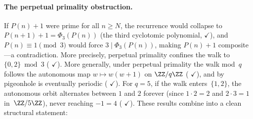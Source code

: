 \paragraph{The perpetual primality obstruction.}
If $P(n){+}1$ were prime for all $n \geq N$, the recurrence
would collapse to $P(n{+}1)+1 = \Phi_3(P(n))$ (the third cyclotomic
polynomial,
{\color{leanink}$\checkmark$}),
and $P(n) \equiv 1 \pmod{3}$ would force $3 \mid \Phi_3(P(n))$,
making $P(n){+}1$ composite---a contradiction.  More precisely,
perpetual primality confines the walk to $\{0,2\} \bmod 3$
(
{\color{leanink}$\checkmark$}).
More generally, under perpetual primality the walk mod~$q$ follows
the autonomous map $w \mapsto w(w{+}1)$ on $\ZZ/q\ZZ$
(
{\color{leanink}$\checkmark$}),
and by pigeonhole is eventually periodic
(
{\color{leanink}$\checkmark$}).
For $q = 5$, if the walk enters~$\{1,2\}$, the autonomous orbit
alternates between $1$ and $2$ forever (since $1 \cdot 2 = 2$ and
$2 \cdot 3 = 1$ in~$\ZZ/5\ZZ$), never reaching $-1 = 4$
(
{\color{leanink}$\checkmark$}).
These results combine into a clean structural statement:

